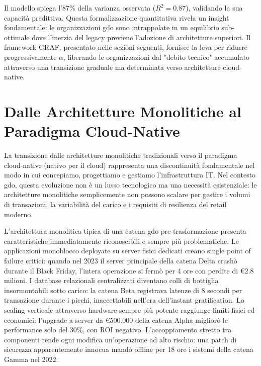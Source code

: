 Il modello spiega l'87\% della varianza osservata ($R^2 = 0.87$), validando la sua capacità predittiva. Questa formalizzazione quantitativa rivela un insight fondamentale: le organizzazioni \gls{gdo} sono intrappolate in un equilibrio sub-ottimale dove l'inerzia del legacy previene l'adozione di architetture superiori. Il framework GRAF, presentato nelle sezioni seguenti, fornisce la leva per ridurre progressivamente $\alpha$, liberando le organizzazioni dal "debito tecnico" accumulato attraverso una transizione graduale ma determinata verso architetture cloud-native.

\section{\texorpdfstring{Dalle Architetture Monolitiche al Paradigma Cloud-Native}{3.3 - Dalle Architetture Monolitiche al Paradigma Cloud-Native}}
\label{sec:evoluzione_architetturale}

La transizione dalle architetture monolitiche tradizionali verso il paradigma cloud-native (nativo per il cloud) rappresenta una discontinuità fondamentale nel modo in cui concepiamo, progettiamo e gestiamo l'infrastruttura IT. Nel contesto \gls{gdo}, questa evoluzione non è un lusso tecnologico ma una necessità esistenziale: le architetture monolitiche semplicemente non possono scalare per gestire i volumi di transazioni, la variabilità del carico e i requisiti di resilienza del retail moderno.

L'architettura monolitica tipica di una catena \gls{gdo} pre-trasformazione presenta caratteristiche immediatamente riconoscibili e sempre più problematiche. Le applicazioni monoblocco deployate su server fisici dedicati creano single point of failure critici: quando nel 2023 il server principale della catena Delta crashò durante il Black Friday, l'intera operazione si fermò per 4 ore con perdite di €2.8 milioni. I database relazionali centralizzati diventano colli di bottiglia insormontabili sotto carico: la catena Beta registrava latenze di 8 secondi per transazione durante i picchi, inaccettabili nell'era dell'instant gratification. Lo scaling verticale attraverso hardware sempre più potente raggiunge limiti fisici ed economici: l'upgrade a server da €500.000 della catena Alpha migliorò le performance solo del 30\%, con ROI negativo. L'accoppiamento stretto tra componenti rende ogni modifica un'operazione ad alto rischio: una patch di sicurezza apparentemente innocua mandò offline per 18 ore i sistemi della catena Gamma nel 2022.

